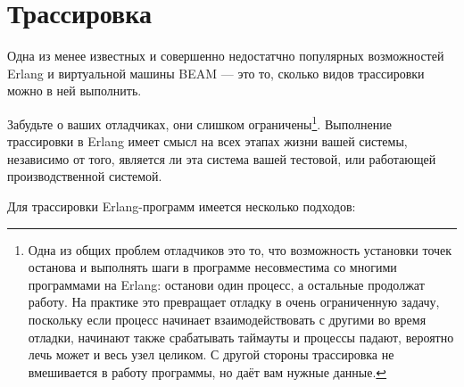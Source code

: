 \chapter{Трассировка}
\label{chap:tracing}

Одна из менее известных и совершенно недостатчно популярных возможностей Erlang и виртуальной машины BEAM --- это то, сколько видов трассировки можно в ней выполнить.

Забудьте о ваших отладчиках, они слишком ограничены\footnote{Одна из общих проблем отладчиков это то, что возможность установки точек останова и выполнять шаги в программе несовместима со многими программами на Erlang: останови один процесс, а остальные продолжат работу. На практике это превращает отладку в очень ограниченную задачу, поскольку если процесс начинает взаимодействовать с другими во время отладки, начинают также срабатывать таймауты и процессы падают, вероятно лечь может и весь узел целиком. С другой стороны трассировка не вмешивается в работу программы, но даёт вам нужные данные.}. Выполнение трассировки в Erlang имеет смысл на всех этапах жизни вашей системы, независимо от того, является ли эта система вашей тестовой, или работающей производственной системой.

Для трассировки Erlang-программ имеется несколько подходов:

